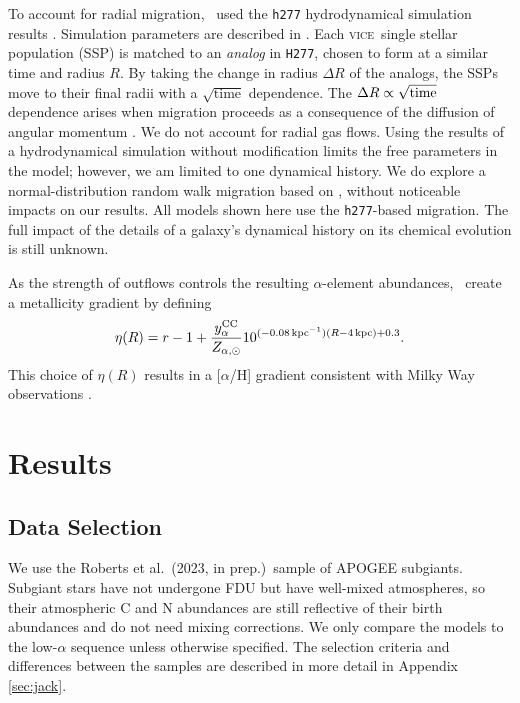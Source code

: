 \documentclass[fleqn,usenatbib]{mnras}
\newcommand{\JJ}{\citetalias{james+21}}
\newcommand{\VICE}{\textsc{vice}}
\newcommand{\citetjack}{Roberts et al.~(2023, in prep.)}
\newcommand{\apogee}{APOGEE}
\begin{document}
To account for radial migration, \JJ\ used the \texttt{h277} hydrodynamical
simulation results \citep{christensen12, zolotov12, loebman12, BZ14}. Simulation parameters are described in \citet{bird+21}. 
Each \VICE\ single stellar population (SSP) is matched to an \textit{analog} in \texttt{H277}, chosen to form at a similar time and radius $R$. By taking the change in radius $\Delta R$ of the analogs, the SSPs move to their final radii with a $\sqrt{\text{time}}$ dependence.
The $\Delta R \propto \sqrt{\rm time}$ dependence arises when migration proceeds as a consequence of the diffusion of angular momentum \citep{frankel18, frankel20}.
We do not account for radial gas flows.
Using the results of a hydrodynamical simulation without modification limits the free parameters in the model; however, we am limited to one dynamical history. 
We do explore a normal-distribution random walk migration based on \citet{frankel18}, without noticeable impacts on our results. All models shown here use the \texttt{h277}-based migration. The full impact of the details of a galaxy's dynamical history on its chemical evolution is still unknown.

As the strength of outflows controls the resulting $\alpha$-element abundances, \JJ~create a metallicity gradient by defining
\begin{equation}\label{eq:eta_r}
\eta(R) = r - 1 + \frac{y_{\alpha}^{\rm CC}}{Z_{\alpha, \odot}} 10^{(-0.08\,\text{kpc}^{-1})(R-4\,\text{kpc})+0.3}.
\end{equation}
This choice of $\eta(R)$ results in a [$\alpha$/H] gradient consistent with Milky Way observations \citep[e.g.][]{hayden+14, weinberg+19, frinchaboy+13}.


\section{Results}
\subsection{Data Selection}

We use the \citetjack~sample of \apogee{} subgiants. Subgiant stars have not undergone FDU but have well-mixed atmospheres, so their atmospheric C and N abundances are still reflective of their birth abundances and do not need mixing corrections. We only compare the models to the low-$\alpha$ sequence unless otherwise specified.  The selection criteria and differences between the samples are described in more detail in Appendix \ref{sec:jack}.
\end{document}
